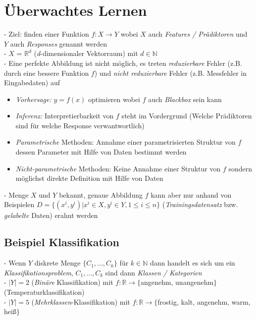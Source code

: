 \documentclass{report}
\begin{document}
\section{Überwachtes Lernen}
- Ziel: finden einer Funktion $f: X \rightarrow Y$ wobei $X$ auch \textit{Features / Prädiktoren} und $Y$ auch \textit{Responses} genannt werden\\
- $X$ = $\mathbb{R}^d$ (\textit{d}-dimensionaler Vektorraum) mit $d\in \mathbb{N}$\\
- Eine perfekte Abbildung ist nicht möglich, es treten \textit{reduzierbare} Fehler (z.B. durch eine bessere Funktion $f$) und \textit{nicht reduzierbare} Fehler (z.B. Messfehler in Eingabedaten) auf\\
\vspace*{-1.5em}
\begin{itemize}
  \item \textit{Vorhersage:} $y = f(x)$ optimieren wobei $f$ auch \textit{Blackbox} sein kann
  \item \textit{Inferenz:} Interpretierbarkeit von $f$ steht im Vordergrund (Welche Prädiktoren sind für welche Response verwantwortlich)
  \item \textit{Parametrische} Methoden: Annahme einer parametrisierten Struktur von $f$ dessen Parameter mit Hilfe von Daten bestimmt werden
  \item \textit{Nicht-parametrische} Methoden: Keine Annahme einer Struktur von $f$ sondern möglichst direkte Definition mit Hilfe von Daten
\end{itemize}
- Menge $X$ und $Y$ bekannt, genaue Abbildung $f$ kann aber nur anhand von Beispielen $D = \{(x^i, y^i) | x^i \in X, y^i \in Y, 1 \leq i \leq n\}$ (\textit{Trainingsdatensatz} bzw. \textit{gelabelte} Daten) erahnt werden\\

\subsection{Beispiel Klassifikation}
- Wenn $Y$ diskrete Menge $\{C_1, ..., C_k\}$ für $k \in \mathbb{N}$ dann handelt es sich um ein \textit{Klassifikationsproblem}, $C_1, ..., C_k$ sind dann \textit{Klassen / Kategorien}\\
- $|Y| = 2$ (\textit{Binäre} Klassifikation) mit $f : \mathbb{R} \rightarrow \{$angenehm, unangenehm$\}$ (Temperaturklassifikation)\\
- $|Y| = 5$ (\textit{Mehrklassen}-Klassifikation) mit $f : \mathbb{R} \rightarrow \{$frostig, kalt, angenehm, warm, heiß$\}$
\end{document}
